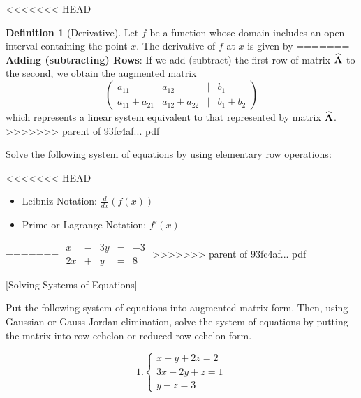 \documentclass[]{book}
\providecommand{\tightlist}{%
  \setlength{\itemsep}{0pt}\setlength{\parskip}{0pt}}
\theoremstyle{definition}
\newtheorem{definition}{Definition}[chapter]
\theoremstyle{definition}
\theoremstyle{definition}
\theoremstyle{remark}
\begin{document}
<<<<<<< HEAD
\begin{definition}[Derivative]
\protect\hypertarget{def:unnamed-chunk-15}{}{\label{def:unnamed-chunk-15} {} }Let \(f\) be a function whose domain includes an open interval containing the point \(x\). The derivative of \(f\) at \(x\) is given by
=======
\textbf{Adding (subtracting) Rows}: If we add (subtract) the first row of matrix \(\widehat{\bf A}\) to the second, we obtain the augmented matrix
\[\begin{pmatrix}
            a_{11} & a_{12} & | & b_1\\
            a_{11}+a_{21} & a_{12}+a_{22} & | & b_1+b_2
            \end{pmatrix}\]
which represents a linear system equivalent to that represented by matrix \(\widehat{\bf A}\).
>>>>>>> parent of 93fc4af... pdf

\protect\hypertarget{exm:solvesys}{}{\label{exm:solvesys} }

Solve the following system of equations by using elementary row operations:

<<<<<<< HEAD
\begin{itemize}
\tightlist
\item
  Leibniz Notation: \(\frac{d}{dx}(f(x))\)
\item
  Prime or Lagrange Notation: \(f'(x)\)
\end{itemize}
\end{definition}
=======
\(\begin{matrix}  x & - & 3y & = & -3\\  2x & + & y & = & 8  \end{matrix}\)
>>>>>>> parent of 93fc4af... pdf

[Solving Systems of Equations]
\protect\hypertarget{exr:solvesys1}{}{\label{exr:solvesys1} {} }

Put the following system of equations into augmented matrix form. Then, using Gaussian or Gauss-Jordan elimination, solve the system of equations by putting the matrix into row echelon or reduced row echelon form.

\[
  1. \begin{cases}
               x + y + 2z = 2\\
               3x - 2y + z = 1\\
               y - z = 3
            \end{cases}
               \]
\end{document}
